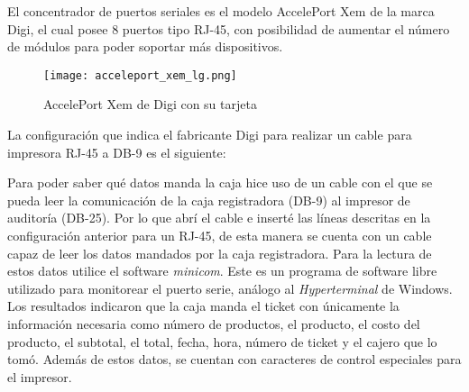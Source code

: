 El concentrador de puertos seriales es el modelo AccelePort  Xem de la marca Digi, el cual posee 8 puertos tipo RJ-45, con posibilidad de aumentar el número de módulos para poder soportar más dispositivos.

\begin{figure}[htb]
 \begin{center}
  \texttt{[image: acceleport\_xem\_lg.png]}
 \end{center}
 \caption{AccelePort Xem de Digi con su tarjeta}
 \label{fig:digi}
\end{figure}

La configuración que indica el fabricante Digi para realizar un cable para impresora RJ-45 a DB-9 es el siguiente:


\begin{center}
\end{center}

Para poder saber qué datos manda la caja hice uso de un cable con el que se pueda leer la comunicación de la caja registradora (DB-9) al impresor de auditoría (DB-25). Por lo que abrí el cable e inserté las líneas descritas en la configuración anterior para un RJ-45, de esta manera se cuenta con un cable capaz de leer los datos mandados por la caja registradora. Para la lectura de estos datos utilice el software \textit{minicom}. Este es un programa de software libre utilizado para monitorear el puerto serie, análogo al \textit{Hyperterminal} de Windows. Los resultados indicaron que la caja manda el ticket con únicamente la información necesaria como número de productos, el producto, el costo del producto, el subtotal, el total, fecha, hora, número de ticket y el cajero que lo tomó. Además de estos datos, se cuentan con caracteres de control especiales para el impresor.


